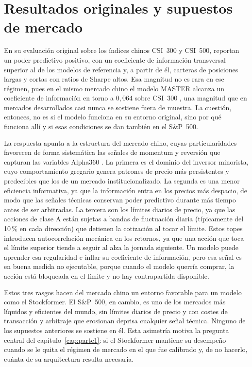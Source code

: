 \section{Resultados originales y supuestos de mercado}\label{sec:original-results}

En su evaluación original sobre los índices chinos CSI~300 y CSI~500,
\textcite{ma2024stockformer} reportan un poder predictivo positivo, con un coeficiente de
información transversal superior al de los modelos de referencia y, a partir de él,
carteras de posiciones largas y cortas con ratios de Sharpe altos. Esa magnitud no es rara
en ese régimen, pues en el mismo mercado chino el modelo MASTER alcanza un coeficiente de
información en torno a $0{,}064$ sobre CSI~300 \autocite{li2024master}, una magnitud que
en mercados desarrollados casi nunca se sostiene fuera de muestra. La cuestión, entonces,
no es si el modelo funciona en su entorno original, sino por qué funciona allí y si esas
condiciones se dan también en el S\&P~500.

La respuesta apunta a la estructura del mercado chino, cuyas particularidades favorecen de
forma sistemática las señales de momentum y reversión que capturan las variables Alpha360
\autocite{liu2019size}. La primera es el dominio del inversor minorista, cuyo
comportamiento gregario genera patrones de precio más persistentes y predecibles que los
de un mercado institucionalizado. La segunda es una menor eficiencia informativa, ya que la
información entra en los precios más despacio, de modo que las señales técnicas conservan
poder predictivo durante más tiempo antes de ser arbitradas. La tercera son los límites
diarios de precio, ya que las acciones de clase A están sujetas a bandas de fluctuación
diaria (típicamente del 10\,\% en cada dirección) que detienen la cotización al tocar el
límite.
Estos topes introducen autocorrelación mecánica en los retornos, ya que una acción que
toca el límite superior tiende a seguir al alza la jornada siguiente. Un modelo puede
aprender esa regularidad e inflar su coeficiente de información, pero esa señal es en
buena medida no ejecutable, porque cuando el modelo querría comprar, la acción está
bloqueada en el límite y no hay contrapartida disponible.

Estos tres rasgos hacen del mercado chino un entorno favorable para un modelo como el
Stockformer. El S\&P~500, en cambio, es uno de los mercados más líquidos y eficientes del
mundo, sin límites diarios de precio y con costes de transacción y arbitraje que erosionan
deprisa cualquier señal técnica. Ninguno de los supuestos anteriores se sostiene en él.
Esta asimetría motiva la pregunta central del capítulo~\ref{cap:parte1}: si el
Stockformer mantiene su desempeño cuando se le quita el régimen de mercado en el que fue
calibrado y, de no hacerlo, cuánta de su arquitectura resulta necesaria.
